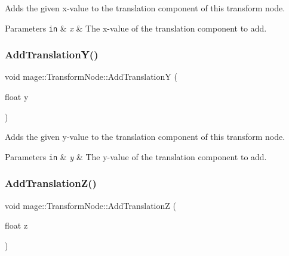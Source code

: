 Adds the given x-\/value to the translation component of this transform node.


\begin{DoxyParams}[1]{Parameters}
\mbox{\tt in}  & {\em x} & The x-\/value of the translation component to add. \\
\hline
\end{DoxyParams}
\hypertarget{structmage_1_1_transform_node_a1ca03ded81979a9b550abd0448312145}{}\label{structmage_1_1_transform_node_a1ca03ded81979a9b550abd0448312145} 
\subsubsection{\texorpdfstring{Add\+Translation\+Y()}{AddTranslationY()}}
{\footnotesize\ttfamily void mage\+::\+Transform\+Node\+::\+Add\+TranslationY (\begin{DoxyParamCaption}\item[{float}]{y }\end{DoxyParamCaption})\hspace{0.3cm}{\ttfamily [noexcept]}}

Adds the given y-\/value to the translation component of this transform node.


\begin{DoxyParams}[1]{Parameters}
\mbox{\tt in}  & {\em y} & The y-\/value of the translation component to add. \\
\hline
\end{DoxyParams}
\hypertarget{structmage_1_1_transform_node_a61f1e890ed57bde29bbd7aa93b15c1b7}{}\label{structmage_1_1_transform_node_a61f1e890ed57bde29bbd7aa93b15c1b7} 
\subsubsection{\texorpdfstring{Add\+Translation\+Z()}{AddTranslationZ()}}
{\footnotesize\ttfamily void mage\+::\+Transform\+Node\+::\+Add\+TranslationZ (\begin{DoxyParamCaption}\item[{float}]{z }\end{DoxyParamCaption})\hspace{0.3cm}{\ttfamily [noexcept]}}

